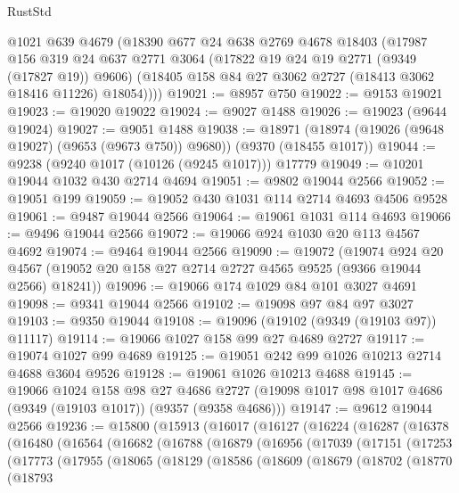 \begin{lexlean}{RustStd}
\begin{coremodule}
      @1021
      @639
      @4679
      (@18390
        @677
        @24
        @638
        @2769
        @4678
        @18403
        (@17987
          @156
          @319
          @24
          @637
          @2771
          @3064
          (@17822 @19 @24 @19 @2771 (@9349 (@17827 @19)) @9606)
          (@18405 @158 @84 @27 @3062 @2727 (@18413 @3062 @18416 @11226) @18054))))
@19021 := @8957 @750
@19022 := @9153 @19021
@19023 := @19020 @19022
@19024 := @9027 @1488
@19026 := @19023 (@9644 @19024)
@19027 := @9051 @1488
@19038 := @18971 (@18974 (@19026 (@9648 @19027) (@9653 (@9673 @750)) @9680)) (@9370 (@18455 @1017))
@19044 := @9238 (@9240 @1017 (@10126 (@9245 @1017))) @17779
@19049 := @10201 @19044 @1032 @430 @2714 @4694
@19051 := @9802 @19044 @2566
@19052 := @19051 @199
@19059 := @19052 @430 @1031 @114 @2714 @4693 @4506 @9528
@19061 := @9487 @19044 @2566
@19064 := @19061 @1031 @114 @4693
@19066 := @9496 @19044 @2566
@19072 := @19066 @924 @1030 @20 @113 @4567 @4692
@19074 := @9464 @19044 @2566
@19090 := @19072
    (@19074
      @924
      @20
      @4567
      (@19052 @20 @158 @27 @2714 @2727 @4565 @9525 (@9366 @19044 @2566) @18241))
@19096 := @19066 @174 @1029 @84 @101 @3027 @4691
@19098 := @9341 @19044 @2566
@19102 := @19098 @97 @84 @97 @3027
@19103 := @9350 @19044
@19108 := @19096 (@19102 (@9349 (@19103 @97)) @11117)
@19114 := @19066 @1027 @158 @99 @27 @4689 @2727
@19117 := @19074 @1027 @99 @4689
@19125 := @19051 @242 @99 @1026 @10213 @2714 @4688 @3604 @9526
@19128 := @19061 @1026 @10213 @4688
@19145 := @19066
    @1024
    @158
    @98
    @27
    @4686
    @2727
    (@19098 @1017 @98 @1017 @4686 (@9349 (@19103 @1017)) (@9357 (@9358 @4686)))
@19147 := @9612 @19044 @2566
@19236 := @15800
    (@15913
      (@16017
        (@16127
          (@16224
            (@16287
              (@16378
                (@16480
                  (@16564
                    (@16682
                      (@16788
                        (@16879
                          (@16956
                            (@17039
                              (@17151
                                (@17253
                                  (@17773
                                    (@17955
                                      (@18065
                                        (@18129
                                          (@18586
                                            (@18609
                                              (@18679
                                                (@18702
                                                  (@18770
                                                    (@18793

\end{coremodule}
\end{lexlean}
